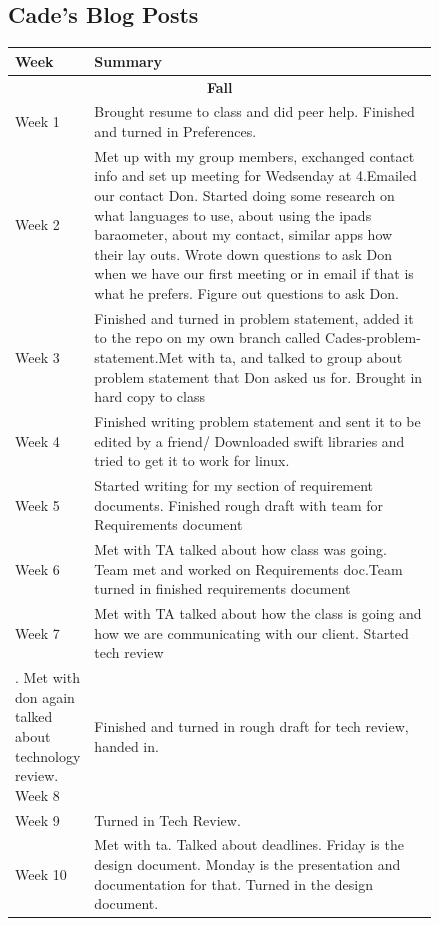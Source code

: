 \documentclass[onecolumn, draftclsnofoot,10pt, compsoc]{IEEEtran}
\begin{document}
\subsection{Cade's Blog Posts}
\begin{center}
	\begin{longtable}{| l | p{0.84\linewidth}|}
		\hline
	Week & Summary \\ \hline
    \multicolumn{2}{c}{\textbf{Fall}} \\ \hline
    Week 1 & Brought resume to class and did peer help. Finished and turned in Preferences.  \\ \hline
	Week 2 & Met up with my group members, exchanged contact info and set up meeting for Wedsenday at 4.Emailed our contact Don. Started doing some research on what languages to use, about using the ipads baraometer, about my contact, similar apps how their lay outs. Wrote down questions to ask Don when we have our first meeting or in email if that is what he prefers. Figure out questions to ask Don.   \\ \hline
	Week 3 & Finished and turned in problem statement, added it to the repo on my own branch called Cades-problem-statement.Met with ta, and talked to group about problem statement that Don asked us for. Brought in hard copy to class    \\ \hline
	Week 4 &  Finished writing problem statement and sent it to be edited by a friend/ Downloaded swift libraries and tried to get it to work for linux. \\ \hline
    Week 5 & Started writing for my section of requirement documents. Finished rough draft with team for Requirements document  \\ \hline
    Week 6 & Met with TA talked about how class was going. Team met and worked on Requirements doc.Team turned in finished requirements document    \\ \hline
	Week 7 &  Met with TA talked about how the class is going and how we are communicating with our client. Started tech review  \\ \hline. Met with don again talked about technology review.
	Week 8 & Finished and turned in rough draft for tech review, handed in.  \\ \hline
	Week 9 & Turned in Tech Review.    \\ \hline
    Week 10 & Met with ta. Talked about deadlines. Friday is the design document. Monday is the presentation and documentation for that. Turned in the design document.  \\ \hline

\end{longtable}
\end{center}
\end{document}
